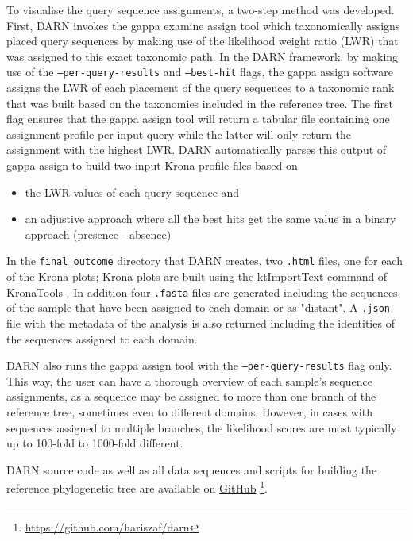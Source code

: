    To visualise the query sequence assignments, a two-step method was developed. 
   First, DARN invokes the gappa examine assign tool which taxonomically assigns placed query sequences by making use of the likelihood weight ratio (LWR) that was assigned to this exact taxonomic path. 
   In the DARN framework, by making use of the \texttt{--per-query-results} and \texttt{--best-hit} flags, the gappa assign software assigns the LWR of each placement of the query sequences to a taxonomic rank that was built based on the taxonomies included in the reference tree. 
   The first flag ensures that the gappa assign tool will return a tabular file containing one assignment profile per input query while the latter will only return the assignment with the highest LWR. 
   DARN automatically parses this output of gappa assign to build two input Krona profile files based on 

   \begin{itemize}
      \item the LWR values of each query sequence and
      \item an adjustive approach where all the best hits get the same value in a binary approach (presence - absence)
   \end{itemize}
   
   In the \texttt{final\_outcome} directory that DARN creates, two \texttt{.html} files, one for each of the Krona plots; 
   Krona plots are built using the ktImportText command of KronaTools \cite{ondov2011interactive}. 
   In addition four \texttt{.fasta} files are generated including the sequences of the sample that have been assigned to each domain or as "distant". 
   A \texttt{.json} file with the metadata of the analysis is also returned including the identities of the sequences assigned to each domain.

   DARN also runs the gappa assign tool with the \texttt{--per-query-results} flag only. 
   This way, the user can have a thorough overview of each sample’s sequence assignments, as a sequence may be assigned to more than one branch of the reference tree, sometimes even to different domains. 
   However, in cases with sequences assigned to multiple branches, the likelihood scores are most typically up to 100-fold to 1000-fold different.

   DARN source code as well as all data sequences and scripts for building the reference phylogenetic tree are available on \href{https://github.com/hariszaf/darn}{GitHub} \footnote{
      \href{https://github.com/hariszaf/darn}{https://github.com/hariszaf/darn}
   }.



